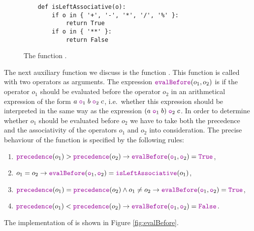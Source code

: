 \begin{figure}[!ht]
\centering
\begin{verbatim}
    def isLeftAssociative(o):
        if o in { '+', '-', '*', '/', '%' }:
            return True
        if o in { '**' }:
            return False
\end{verbatim}
\vspace*{-0.3cm}
\caption{The function .}
\label{fig:isLeftAssociative}
\end{figure}
The next auxiliary function we discuss is the function .  This function is called with two
operators as arguments.  The expression $\mytt{evalBefore}(o_1, o_2)$ is 
if the operator $o_1$ should be evaluated before the operator $o_2$ in an arithmetical expression of the form
$a \;\mytt{o}_1\; b \;\mytt{o}_2\; c$, i.e.~whether this expression should be interpreted in the same way
as the expression $(a \;\mytt{o}_1\; b) \;\mytt{o}_2\; c$.  In order to determine whether $o_1$ should be
evaluated before $o_2$ we have to take both the precedence and the associativity of the operators $o_1$ and $o_2$ into
consideration.   The precise behaviour of the function  is specified by the following rules:
\begin{enumerate}
\item $\mytt{precedence}(o_1) > \mytt{precedence}(o_2) \rightarrow 
      \mytt{evalBefore}(\mytt{o}_1, \mytt{o}_2) = \mytt{True}$,
\item $o_1 = o_2 \rightarrow \mytt{evalBefore}(\mytt{o}_1, \mytt{o}_2) = \mytt{isLeftAssociative}(o_1)$,
\item $\mytt{precedence}(o_1) = \mytt{precedence}(o_2) \wedge o_1 \not= o_2 \rightarrow 
       \mytt{evalBefore}(\mytt{o}_1, \mytt{o}_2) = \mytt{True}$,
\item $\mytt{precedence}(o_1) < \mytt{precedence}(o_2) \rightarrow 
       \mytt{evalBefore}(\mytt{o}_1, \mytt{o}_2) = \mytt{False}$.
\end{enumerate}
The implementation of  is shown in Figure \ref{fig:evalBefore}.

